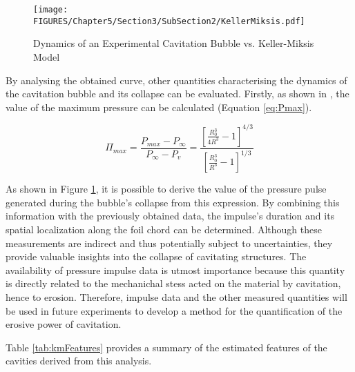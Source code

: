 \begin{figure}[htbp]
    \centering
    \texttt{[image: FIGURES/Chapter5/Section3/SubSection2/KellerMiksis.pdf]}
    \caption{Dynamics of an Experimental Cavitation Bubble vs. Keller-Miksis Model}
    \label{fig:KellerMiksis}
\end{figure}

By analysing the obtained curve, other quantities characterising the dynamics of the cavitation bubble and its collapse can be evaluated. Firstly, as shown in \cite{franc2006fundamentals}, the value of the maximum pressure can be calculated (Equation \ref{eq:Pmax}).

\begin{equation}
    \Pi_{max} = \frac{P_{max} - P_\infty}{P_\infty - P_v} = \frac{\left[\frac{R_0^3}{4R^3}-1\right]^{4/3}}{\left[\frac{R_0^3}{R^3}-1\right]^{1/3}}
    \label{eq:Pmax}
\end{equation}

As shown in Figure \ref{fig:KellerMiksis}, it is possible to derive the value of the pressure pulse generated during the bubble's collapse from this expression. By combining this information with the previously obtained data, the impulse's duration and its spatial localization along the foil chord can be determined.
Although these measurements are indirect and thus potentially subject to uncertainties, they provide valuable insights into the collapse of cavitating structures. The availability of pressure impulse data is utmost importance because this quantity is directly related to the mechanichal stess acted on the material by cavitation, hence to erosion. 
Therefore, impulse data and the other  measured quantities will be used in future experiments to develop a method for the quantification of the erosive power of cavitation.

Table \ref{tab:kmFeatures} provides a summary of the estimated features of the cavities derived from this analysis.

\begin{center}
\end{center}


